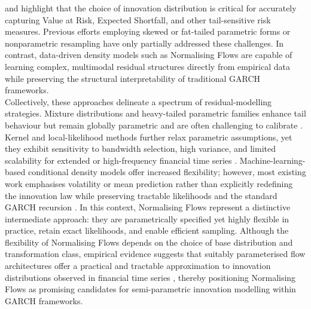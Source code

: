 \documentclass[oneside,12pt]{CUEDthesisPSnPDF}
\newcommand{\textcite}{\citet}
\newcommand{\parencite}{\citep}
\begin{document}
\textcite{bauwens2006multivariate} and \textcite{hansen1994autoregressive} highlight that the choice of innovation distribution is critical for accurately capturing Value at Risk, Expected Shortfall, and other tail-sensitive risk measures. Previous efforts employing skewed or fat-tailed parametric forms \parencite{bollerslev1987conditionally,hansen1994autoregressive} or nonparametric resampling \parencite{mcneil2000estimation} have only partially addressed these challenges. In contrast, data-driven density models such as Normalising Flows are capable of learning complex, multimodal residual structures directly from empirical data while preserving the structural interpretability of traditional GARCH frameworks.\\

Collectively, these approaches delineate a spectrum of residual-modelling strategies. Mixture distributions and heavy-tailed parametric families enhance tail behaviour but remain globally parametric and are often challenging to calibrate \parencite{bauwens2006multivariate}. Kernel and local-likelihood methods further relax parametric assumptions, yet they exhibit sensitivity to bandwidth selection, high variance, and limited scalability for extended or high-frequency financial time series \parencite{silverman1986density}. Machine-learning-based conditional density models offer increased flexibility; however, most existing work emphasises volatility or mean prediction rather than explicitly redefining the innovation law while preserving tractable likelihoods and the standard GARCH recursion \parencite{bao2017deep}. In this context, Normalising Flows represent a distinctive intermediate approach: they are parametrically specified yet highly flexible in practice, retain exact likelihoods, and enable efficient sampling. Although the flexibility of Normalising Flows depends on the choice of base distribution and transformation class, empirical evidence suggests that suitably parameterised flow architectures offer a practical and tractable approximation to innovation distributions observed in financial time series \parencite{papamakarios2021normalizing}, thereby positioning Normalising Flows as promising candidates for semi-parametric innovation modelling within GARCH frameworks.\\


\end{document}
